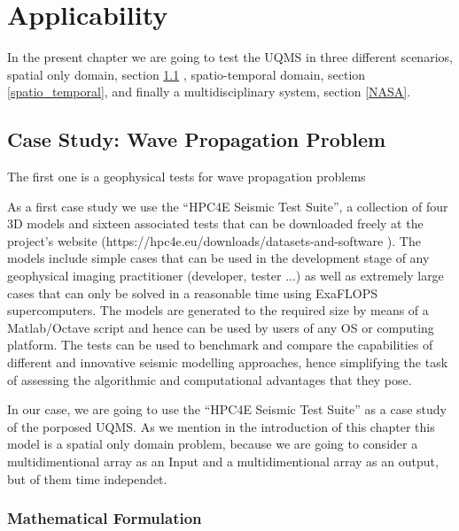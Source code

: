 \chapter[Applicability]{Applicability}\label{Applicability}

In the present chapter we are going to test the UQMS in three different scenarios, spatial only domain, section \ref{Wave Propagation} , spatio-temporal domain, section \ref{spatio_temporal}, and finally a multidisciplinary system, section \ref{NASA}. 

\section{Case Study:  Wave Propagation Problem}\label{Wave Propagation}

The first one is a geophysical tests for wave propagation problems

As a first case study we use the “HPC4E Seismic Test Suite”, a collection of four 3D models and sixteen associated tests that can be downloaded freely at the project's website (https://hpc4e.eu/downloads/datasets-and-software ). The models include simple cases that can be used in the development stage of any geophysical imaging practitioner (developer, tester ...) as well as extremely large cases that can only be solved in a reasonable time using ExaFLOPS supercomputers. The models are generated to the required size by means of a Matlab/Octave script and hence can be used by users of any OS or computing platform. The tests can be used to benchmark and compare the capabilities of different and innovative seismic modelling approaches, hence simplifying the task of assessing the algorithmic and computational advantages that they pose. %

In our case, we are going to use the “HPC4E Seismic Test Suite” as a case study of the porposed UQMS. As we mention in the introduction of this chapter this model is a spatial only domain problem, because we are going to consider a multidimentional array as an Input and a multidimentional array as an output, but of them time independet.

\subsection{Mathematical Formulation}

